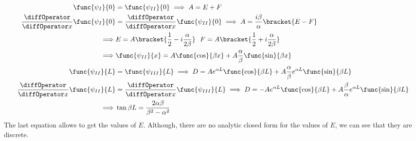 \begin{align*}
    \func{\psi_{I}}{0} &= \func{\psi_{II}}{0} \implies A = E + F\\
    \frac{\diffOperator}{\diffOperator x}\func{\psi_{I}}{0} &= \frac{\diffOperator}{\diffOperator x}\func{\psi_{II}}{0} \implies A = \frac{i\beta}{\alpha} \bracket{E - F}\\
    \implies& E = A \bracket{\frac{1}{2} - i \frac{\alpha}{2\beta} } \ \ F = A \bracket{\frac{1}{2} + i \frac{\alpha}{2\beta} }\\
    \implies& \func{\psi_{II}}{x} = A \func{\cos}{\beta x} + A \frac{\alpha}{\beta} \func{\sin}{\beta x}\\
    \func{\psi_{II}}{L} &= \func{\psi_{III}}{L} \implies D = A e^{\alpha L}\func{\cos}{\beta L} + A \frac{\alpha}{\beta} e^{\alpha L}\func{\sin}{\beta L}\\
    \frac{\diffOperator}{\diffOperator x}\func{\psi_{II}}{L} &= \frac{\diffOperator}{\diffOperator x}\func{\psi_{III}}{L} \implies  D = - A e^{\alpha L}\func{\cos}{\beta L} + A \frac{\beta}{\alpha} e^{\alpha L}\func{\sin}{\beta L}\\
    \implies & \tan \beta L = \frac{2\alpha \beta}{\beta^2 - \alpha^2}
\end{align*}
The last equation allows to get the values of \(E\). Although, there are no analytic closed form for the values of \(E\), we can see that they are discrete. 
